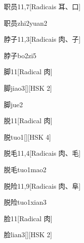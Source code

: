 \begin{entry}{职员}{11,7}[Radicais ⽿、⼝]
  \begin{phonetics}{职员}{zhi2yuan2}
  \end{phonetics}
\end{entry}

\begin{entry}{脖子}{11,3}[Radicais ⾁、⼦]
  \begin{phonetics}{脖子}{bo2zi5}
  \end{phonetics}
\end{entry}

\begin{entry}{脚}{11}[Radical ⾁]
  \begin{phonetics}{脚}{jiao3}[][HSK 2]
  \end{phonetics}
  \begin{phonetics}{脚}{jue2}
  \end{phonetics}
\end{entry}

\begin{entry}{脱}{11}[Radical ⾁]
  \begin{phonetics}{脱}{tuo1}[][HSK 4]
  \end{phonetics}
\end{entry}

\begin{entry}{脱毛}{11,4}[Radicais ⾁、⽑]
  \begin{phonetics}{脱毛}{tuo1mao2}
  \end{phonetics}
\end{entry}

\begin{entry}{脱险}{11,9}[Radicais ⾁、⾩]
  \begin{phonetics}{脱险}{tuo1xian3}
  \end{phonetics}
\end{entry}

\begin{entry}{脸}{11}[Radical ⾁]
  \begin{phonetics}{脸}{lian3}[][HSK 2]
  \end{phonetics}
\end{entry}

